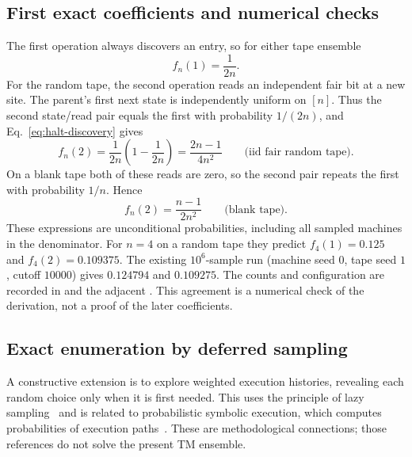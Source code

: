 \documentclass{article}
\begin{document}
\subsection{First exact coefficients and numerical checks}

The first operation always discovers an entry, so for either tape ensemble
\begin{equation}
f_n(1)=\frac{1}{2n}.
\end{equation}
For the random tape, the second operation reads an independent fair bit
at a new site.  The parent's first next state is independently uniform
on $[n]$.  Thus the second state/read pair equals the first with probability
$1/(2n)$, and Eq.~\eqref{eq:halt-discovery} gives
\begin{equation}
f_n(2)=\frac{1}{2n}\left(1-\frac{1}{2n}\right)
      =\frac{2n-1}{4n^2}
      \qquad\text{(iid fair random tape)}.
\label{eq:halt-second-random}
\end{equation}
On a blank tape both of these reads are zero, so the second pair repeats
the first with probability $1/n$.  Hence
\begin{equation}
f_n(2)=\frac{n-1}{2n^2}
      \qquad\text{(blank tape)}.
\label{eq:halt-second-blank}
\end{equation}
These expressions are unconditional probabilities, including all sampled
machines in the denominator.  For $n=4$ on a random tape they predict
$f_4(1)=0.125$ and $f_4(2)=0.109375$.  The existing $10^6$-sample run
(machine seed $0$, tape seed $1$, cutoff $10000$) gives $0.124794$ and
$0.109275$.  The counts and configuration are recorded in
and the adjacent .  This agreement is a numerical
check of the derivation, not a proof of the later coefficients.

\subsection{Exact enumeration by deferred sampling}

A constructive extension is to explore weighted execution histories,
revealing each random choice only when it is first needed.  This uses
the principle of lazy sampling~\citep{metere2023lazy} and is related to
probabilistic symbolic execution, which computes probabilities of
execution paths~\citep{susag2022symbolic}.  These are methodological
connections; those references do not solve the present TM ensemble.
\end{document}
